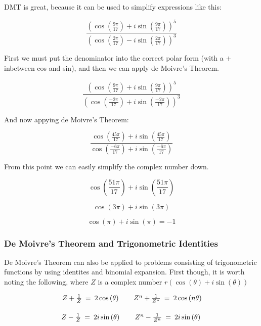 \documentclass{article}
\begin{document}
DMT is great, because it can be used to simplify expressions like this:

\[\frac{\left(\cos\left(\frac{9\pi}{17}\right)+i\sin\left(\frac{9\pi}{17}\right)\right)^5}{\left(\cos\left(\frac{2\pi}{17}\right)-i\sin\left(\frac{2\pi}{17}\right)\right)^3}\]

\noindent First we must put the denominator into the correct polar form (with a
\(+\) inbetween cos and sin), and then we can apply de Moivre's Theorem.

\[\frac{\left(\cos\left(\frac{9\pi}{17}\right)+i\sin\left(\frac{9\pi}{17}\right)\right)^5}{\left(\cos\left(\frac{-2\pi}{17}\right)+i\sin\left(\frac{-2\pi}{17}\right)\right)^3}\]

\noindent And now appying de Moivre's Theorem:

\[\frac{\cos\left(\frac{45\pi}{17}\right)+i\sin\left(\frac{45\pi}{17}\right)}{\cos\left(\frac{-6\pi}{17}\right)+i\sin\left(\frac{-6\pi}{17}\right)}\]

\noindent From this point we can easily simplify the complex number down.

\[\cos\left(\frac{51\pi}{17}\right)+i\sin\left(\frac{51\pi}{17}\right)\]

\[\cos\left(3\pi\right)+i\sin\left(3\pi\right)\]

\[\cos\left(\pi\right)+i\sin\left(\pi\right)=-1\]

\subsubsection{De Moivre's Theorem and Trigonometric Identities}

De Moivre's Theorem can also be applied to problems consisting of trigonometric
functions by using identites and binomial expansion. First though, it is worth
noting the following, where \(Z\) is a complex number
\(r\left(\cos\left(\theta\right)+i\sin\left(\theta\right)\right)\)

\[\begin{array}{cc} 
            \vspace{15pt} Z+\frac{1}{Z} \:=\: 2\cos\left(\theta\right) \hspace{10pt} & Z^n+\frac{1}{Z^n} \:=\: 2\cos\left(n\theta\right) \\
            Z-\frac{1}{Z} \:=\: 2i\sin\left(\theta\right) \hspace{10pt} &  Z^n-\frac{1}{Z^n} \:=\: 2i\sin\left(\theta\right)
\end{array}\]
\end{document}
